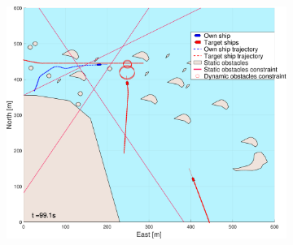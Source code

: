 \begin{figure}[!ht]
\begin{subfigure}[b]{0.494\textwidth}
        \subcaption{}
    \end{subfigure}
    \hfill
    \\
    \begin{subfigure}[b]{0.494\textwidth}
        \centering
        \includegraphics[width=\textwidth]{Images/NewFigures/skjergard_m_trafikk_NEW/_Simple_0fig1_time=100}
        \subcaption{}
    \end{subfigure}
    \hfill
    \begin{subfigure}[b]{0.494\textwidth}
        \centering

\end{subfigure}
\end{figure}
